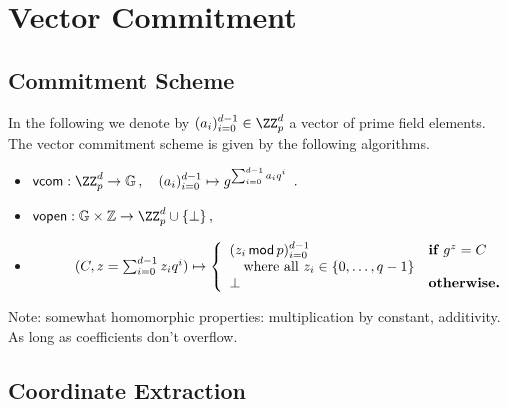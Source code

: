 \documentclass{article}
\theoremstyle{definition}
\begin{document}
\section{Vector Commitment}


\subsection{Commitment Scheme}

In the following we denote by $(a_i)_{i=0}^{d-1} \in \ZZ_p^{d}$ a vector of prime field elements. The vector commitment scheme is given by the following algorithms.
\begin{itemize}
\item $\mathsf{vcom} : \ZZ_p^d \rightarrow \mathbb{G} \, , \quad (a_i)_{i=0}^{d-1} \mapsto g^{\sum_{i=0}^{d-1} a_iq^i} \enspace .$
\item $\mathsf{vopen} : \mathbb{G} \times \mathbb{Z} \rightarrow \ZZ_p^d \cup \{\bot\} \, , $
\item[] $\phantom{\mathsf{vopen} :} (C, z = \sum_{i=0}^{d-1} z_iq^i) \mapsto \left\lbrace \begin{array}{ll}
(z_i \, \mathsf{mod} \, p)_{i=0}^{d-1} & \textnormal{\bf if } g^z = C \\
\quad \textnormal{where all } z_i \in \{0,\ldots,q-1\} & \\
\bot & \textnormal{\bf otherwise.}
\end{array} \right.$ 
\end{itemize}

Note: somewhat homomorphic properties: multiplication by constant, additivity. As long as coefficients don't overflow.

\subsection{Coordinate Extraction}
\end{document}
